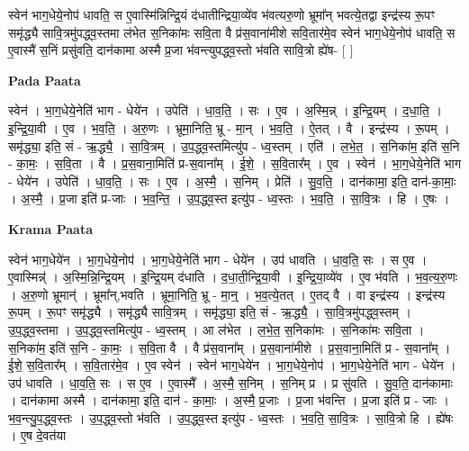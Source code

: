 \documentclass[17pt]{extarticle}
\begin{document}
स्वेन॑ भाग॒धेये॒नोप॑ धावति॒ स ए॒वास्मि॑न्निन्द्रि॒यं द॑धातीन्द्रिया॒व्ये॑व भ॑वत्यरु॒णो भ्रूमा᳚न् भवत्ये॒तद्वा इन्द्र॑स्य रू॒पꣳ समृ॑द्ध्यै सावि॒त्रमु॑पद्ध्व॒स्तमा ल॑भेत स॒निका॑मः सवि॒ता वै प्र॑स॒वाना॑मीशे सवि॒तार॑मे॒व स्वेन॑ भाग॒धेये॒नोप॑ धावति॒ स ए॒वास्मै॑ स॒निं प्रसु॑वति॒ दान॑कामा अस्मै प्र॒जा भ॑वन्त्युपद्ध्व॒स्तो भ॑वति सावि॒त्रो ह्ये॑ष- [  ] \newline

\textbf{Pada Paata} \newline

स्वेन॑ । भा॒ग॒धेये॒नेति॑ भाग - धेये॑न । उपेति॑ । धा॒व॒ति॒ । सः । ए॒व । अ॒स्मि॒न्न् । इ॒न्द्रि॒यम् । द॒धा॒ति॒ । इ॒न्द्रि॒या॒वी । ए॒व । भ॒व॒ति॒ । अ॒रु॒णः । भ्रूमा॒निति॒ भ्रू - मा॒न् । भ॒व॒ति॒ । ऐ॒तत् । वै । इन्द्र॑स्य । रू॒पम् । समृ॑द्ध्या॒ इति॒ सं - ऋ॒द्ध्यै॒ । सा॒वि॒त्रम् । उ॒प॒द्ध्व॒स्तमित्यु॑प - ध्व॒स्तम् । एति॑ । ल॒भे॒त॒ । स॒निका॑म॒ इति॑ स॒नि - का॒मः॒ । स॒वि॒ता । वै । प्र॒स॒वाना॒मिति॑ प्र-स॒वाना᳚म् । ई॒शे॒ । स॒वि॒तार᳚म् । ए॒व । स्वेन॑ । भा॒ग॒धेये॒नेति॑ भाग - धेये॑न । उपेति॑ । धा॒व॒ति॒ । सः । ए॒व । अ॒स्मै॒ । स॒निम् । प्रेति॑ । सु॒व॒ति॒ । दान॑कामा॒ इति॒ दान॑-का॒माः॒ । अ॒स्मै॒ । प्र॒जा इति॑ प्र-जाः । भ॒व॒न्ति॒ । उ॒प॒द्ध्व॒स्त इत्यु॑प - ध्व॒स्तः । भ॒व॒ति॒ । सा॒वि॒त्रः । हि । ए॒षः ।  \newline


\textbf{Krama Paata} \newline

स्वेन॑ भाग॒धेये॑न । भा॒ग॒धेये॒नोप॑ । भा॒ग॒धेये॒नेति॑ भाग - धेये॑न । उप॑ धावति । धा॒व॒ति॒ सः । स ए॒व । ए॒वास्मिन्न्॑ । अ॒स्मि॒न्नि॒न्द्रि॒यम् । इ॒न्द्रि॒यम् द॑धाति । द॒धा॒ती॒न्द्रि॒या॒वी । इ॒न्द्रि॒या॒व्ये॑व । ए॒व भ॑वति । भ॒व॒त्य॒रु॒णः । अ॒रु॒णो भ्रूमान्॑ । भ्रूमा᳚न्,भवति । भ्रूमा॒निति॒ भ्रू - मा॒न्॒ । भ॒व॒त्ये॒तत् । ए॒तद् वै । वा इन्द्र॑स्य । इन्द्र॑स्य रू॒पम् । रू॒पꣳ समृ॑द्ध्यै । समृ॑द्ध्यै सावि॒त्रम् । समृ॑द्ध्या॒ इति॒ सं - ऋ॒द्ध्यै॒ । सा॒वि॒त्रमु॑पद्ध्व॒स्तम् । उ॒प॒द्ध्व॒स्तमा । उ॒प॒द्ध्व॒स्तमित्यु॑प - ध्व॒स्तम् । आ ल॑भेत । ल॒भे॒त॒ स॒निका॑मः । स॒निका॑मः सवि॒ता । स॒निका॑म॒ इति॑ स॒नि - का॒मः॒ । स॒वि॒ता वै । वै प्र॑स॒वाना᳚म् । प्र॒स॒वाना॑मीशे । प्र॒स॒वाना॒मिति॑ प्र - स॒वाना᳚म् । ई॒शे॒ स॒वि॒तार᳚म् । स॒वि॒तार॑मे॒व । ए॒व स्वेन॑ । स्वेन॑ भाग॒धेये॑न । भा॒ग॒धेये॒नोप॑ । भा॒ग॒धेये॒नेति॑ भाग - धेये॑न । उप॑ धावति । धा॒व॒ति॒ सः । स ए॒व । ए॒वास्मै᳚ । अ॒स्मै॒ स॒निम् । स॒निम् प्र । प्र सु॑वति । सु॒व॒ति॒ दान॑कामाः । दान॑कामा अस्मै । दान॑कामा॒ इति॒ दान॑ - का॒माः॒ । अ॒स्मै॒ प्र॒जाः । प्र॒जा भ॑वन्ति । प्र॒जा इति॑ प्र - जाः । भ॒व॒न्त्यु॒प॒द्ध्व॒स्तः । उ॒प॒द्ध्व॒स्तो भ॑वति । उ॒प॒द्ध्व॒स्त इत्यु॑प - ध्व॒स्तः । भ॒व॒ति॒ सा॒वि॒त्रः । सा॒वि॒त्रो हि । ह्ये॑षः । ए॒ष दे॒वत॑या \newline
\end{document}
